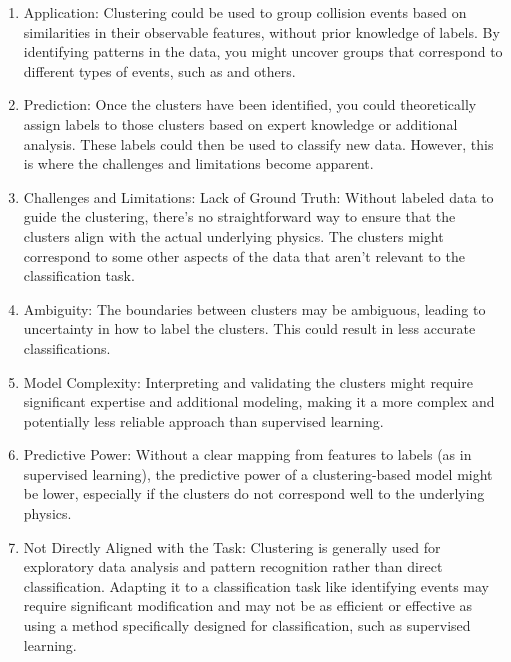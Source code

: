 \begin{enumerate}
      \item Application: Clustering could be used to group collision events based on similarities in their observable
            features, without prior knowledge of labels. By identifying patterns in the data, you might uncover groups
            that correspond to different types of events, such as \tth and others.

      \item Prediction: Once the clusters have been identified, you could theoretically assign labels to those clusters
            based on expert knowledge or additional analysis. These labels could then be used to classify new data.
            However, this is where the challenges and limitations become apparent.

      \item Challenges and Limitations: Lack of Ground Truth: Without labeled data to guide the clustering, there's no
            straightforward way to ensure that the clusters align with the actual underlying physics. The clusters might
            correspond to some other aspects of the data that aren't relevant to the classification task.

      \item Ambiguity: The boundaries between clusters may be ambiguous, leading to uncertainty in how to label the
            clusters. This could result in less accurate classifications.

      \item Model Complexity: Interpreting and validating the clusters might require significant expertise and additional
            modeling, making it a more complex and potentially less reliable approach than supervised learning.

      \item Predictive Power: Without a clear mapping from features to labels (as in supervised learning), the predictive
            power of a clustering-based model might be lower, especially if the clusters do not correspond well to the
            underlying physics.

      \item Not Directly Aligned with the Task: Clustering is generally used for exploratory data analysis and pattern
            recognition rather than direct classification. Adapting it to a classification task like identifying \tth
            events may require significant modification and may not be as efficient or effective as using a method
            specifically designed for classification, such as supervised learning.
\end{enumerate}
